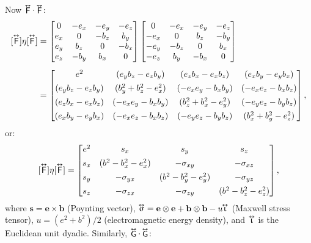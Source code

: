 \documentclass[12pt]{article}
\renewcommand{\vv}[1]{\mathbf{#1}}
\newcommand{\tightoverset}[2]{%
  \mathop{#2}\limits^{\vbox to -.5ex{\kern-0.75ex\hbox{$#1$}\vss}}}
\newcommand{\inlinedy}[1]{\tightoverset{\text{\tiny$\bm\leftrightarrow$}}{#1}}
\newcommand{\capdy}[1]{ \overset{ \text{\tiny$\bm\leftrightarrow$} }{\vphantom{\text{\small{A}}}\smash{#1}} }
\begin{document}
Now $\inlinedy{\mathsf{F}} \cdot \inlinedy{\mathsf{F}}$:
\begin{equation*}
\begin{aligned}
\mkern0mu [\capdy{\mathsf{F}}] \eta [\capdy{\mathsf{F}}]
&=
\begin{bmatrix}
0 & -e_x & -e_y & -e_z \\
e_x & 0 & -b_z & b_y \\
e_y & b_z & 0 & -b_x \\
e_z & -b_y & b_x & 0
\end{bmatrix}
\begin{bmatrix}
0 & -e_x & -e_y & -e_z \\
-e_x & 0 & b_z & -b_y \\
-e_y & -b_z & 0 & b_x \\
-e_z & b_y & -b_x & 0
\end{bmatrix} \\[5pt]
&=
\begin{bmatrix}
e^2 & (e_y b_z - e_z b_y) & (e_z b_x - e_x b_z) & (e_x b_y - e_y b_x) \\[1ex]
(e_y b_z - e_z b_y) & (b_y^2 + b_z^2 - e_x^2) & (-e_x e_y - b_x b_y) & (- e_x e_z - b_x b_z) \\[1ex]
(e_z b_x - e_x b_z) & (-e_x e_y - b_x b_y) & (b_z^2 + b_x^2 - e_y^2)  & (- e_y e_z - b_y b_z) \\[1ex]
(e_x b_y - e_y b_x) & (- e_x e_z - b_x b_z) & (- e_y e_z - b_y b_z) & (b_x^2 + b_y^2 - e_z^2)
\end{bmatrix} ,
\end{aligned}
\end{equation*}
or:
\begin{equation*}
\mkern0mu [\capdy{\mathsf{F}}] \eta [\capdy{\mathsf{F}}]
=
\begin{bmatrix}
e^2 & s_x & s_y & s_z \\[1ex]
s_x & (b^2 - b_x^2 - e_x^2) & - \sigma_{x y} & - \sigma_{x z} \\[1ex]
s_y & - \sigma_{y x} & (b^2 - b_y^2 - e_y^2)  & - \sigma_{y z} \\[1ex]
s_z & - \sigma_{z x} & - \sigma_{z y} & (b^2 - b_z^2 - e_z^2) 
\end{bmatrix} ,
\end{equation*}
where $\vv s = \vv e \times \vv b$ (Poynting vector), $\inlinedy{\upsigma} = \vv e \otimes \vv e + \vv b \otimes \vv b - u \mkern-5mu \inlinedy{\upiota}$ (Maxwell stress tensor), $u = (e^2 + b^2) / 2$ (electromagnetic energy density), and $\inlinedy{\upiota}$ is the Euclidean unit dyadic. Similarly, $\inlinedy{\mathsf{G}} \cdot \inlinedy{\mathsf{G}}$:
\end{document}
